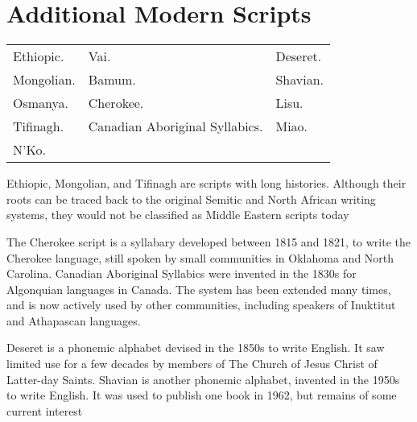 \chapter{Additional Modern Scripts}

\begin{center}
\begin{tabular}{lp{5cm}l}
Ethiopic. &Vai. &Deseret.\\
Mongolian. &Bamum. &Shavian.\\
Osmanya.   &Cherokee. &Lisu.\\
Tifinagh.  &Canadian Aboriginal Syllabics. &Miao.\\
N’Ko.&&\\
\end{tabular}
\end{center}

Ethiopic, Mongolian, and Tifinagh are scripts with long histories. Although their roots can
be traced back to the original Semitic and North African writing systems, they would not
be classified as Middle Eastern scripts today

The Cherokee script is a syllabary developed between 1815 and 1821, to write the Cherokee
language, still spoken by small communities in Oklahoma and North Carolina. Canadian
Aboriginal Syllabics were invented in the 1830s for Algonquian languages in Canada. The
system has been extended many times, and is now actively used by other communities, including speakers of Inuktitut and Athapascan languages.

Deseret is a phonemic alphabet devised in the 1850s to write English. It saw limited use for
a few decades by members of The Church of Jesus Christ of Latter-day Saints. Shavian is
another phonemic alphabet, invented in the 1950s to write English. It was used to publish
one book in 1962, but remains of some current interest
















